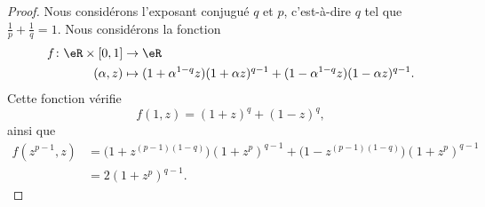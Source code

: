 \begin{proof}
	Nous considérons l'exposant conjugué \( q\) et \( p\), c'est-à-dire \( q\) tel que \( \frac{1}{ p }+\frac{1}{ q }=1\). Nous considérons la fonction
	\begin{equation}
		\begin{aligned}
			f\colon \eR\times \mathopen[ 0 , 1 \mathclose] & \to \eR                                                                          \\
			(\alpha,z)                                     & \mapsto (1+\alpha^{1-q}z)(1+\alpha z)^{q-1}+(1-\alpha^{1-q}z)(1-\alpha z)^{q-1}.
		\end{aligned}
	\end{equation}
	Cette fonction vérifie
	\begin{equation}        \label{EQooRFZQooJvdocT}
		f(1,z)=(1+z)^q+(1-z)^q,
	\end{equation}
	ainsi que
	\begin{subequations}        \label{EQooISBRooHMiPRE}
		\begin{align}
			f(z^{p-1},z) & =\big( 1+z^{(p-1)(1-q)} \big)(1+z^p)^{q-1}+\big( 1-z^{(p-1)(1-q)} \big)(1+z^p)^{q-1} \\
			             & =2(1+z^p)^{q-1}.
		\end{align}
	\end{subequations}


\end{proof}
